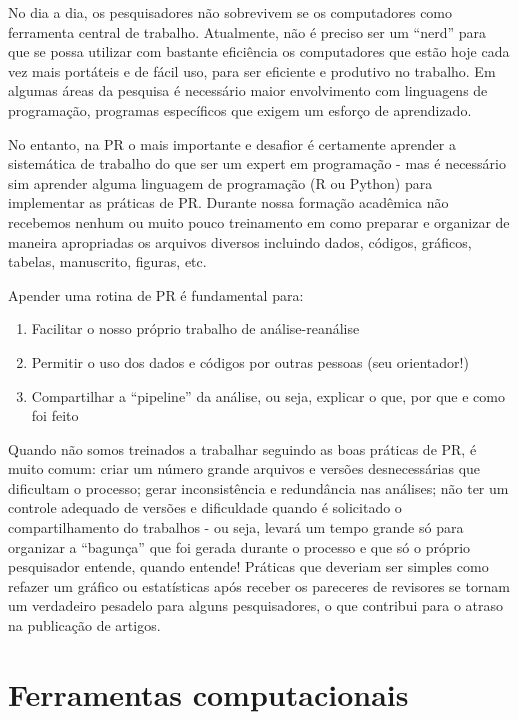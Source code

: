 \documentclass[]{book}
\providecommand{\tightlist}{%
  \setlength{\itemsep}{0pt}\setlength{\parskip}{0pt}}
\begin{document}
No dia a dia, os pesquisadores não sobrevivem se os computadores como
ferramenta central de trabalho. Atualmente, não é preciso ser um
``nerd'' para que se possa utilizar com bastante eficiência os
computadores que estão hoje cada vez mais portáteis e de fácil uso, para
ser eficiente e produtivo no trabalho. Em algumas áreas da pesquisa é
necessário maior envolvimento com linguagens de programação, programas
específicos que exigem um esforço de aprendizado.

No entanto, na PR o mais importante e desafior é certamente aprender a
sistemática de trabalho do que ser um expert em programação - mas é
necessário sim aprender alguma linguagem de programação (R ou Python)
para implementar as práticas de PR. Durante nossa formação acadêmica não
recebemos nenhum ou muito pouco treinamento em como preparar e organizar
de maneira apropriadas os arquivos diversos incluindo dados, códigos,
gráficos, tabelas, manuscrito, figuras, etc.

Apender uma rotina de PR é fundamental para:

\begin{enumerate}
\def\labelenumi{\arabic{enumi})}
\tightlist
\item
  Facilitar o nosso próprio trabalho de análise-reanálise
\item
  Permitir o uso dos dados e códigos por outras pessoas (seu
  orientador!)
\item
  Compartilhar a ``pipeline'' da análise, ou seja, explicar o que, por
  que e como foi feito
\end{enumerate}

Quando não somos treinados a trabalhar seguindo as boas práticas de PR,
é muito comum: criar um número grande arquivos e versões desnecessárias
que dificultam o processo; gerar inconsistência e redundância nas
análises; não ter um controle adequado de versões e dificuldade quando é
solicitado o compartilhamento do trabalhos - ou seja, levará um tempo
grande só para organizar a ``bagunça'' que foi gerada durante o processo
e que só o próprio pesquisador entende, quando entende! Práticas que
deveriam ser simples como refazer um gráfico ou estatísticas após
receber os pareceres de revisores se tornam um verdadeiro pesadelo para
alguns pesquisadores, o que contribui para o atraso na publicação de
artigos.

\hypertarget{ferramentas-computacionais}{%
\section{Ferramentas computacionais}\label{ferramentas-computacionais}}
\end{document}
